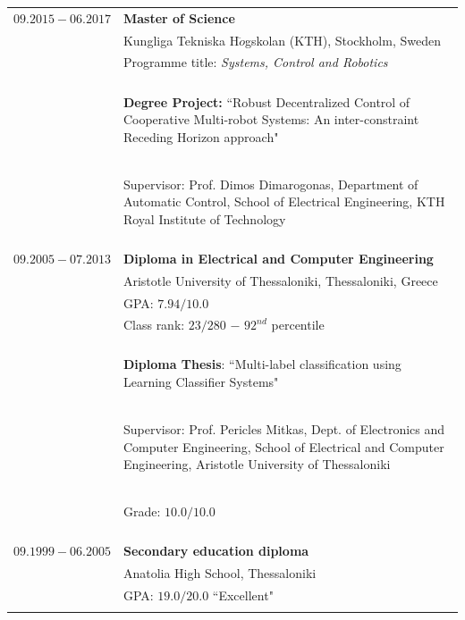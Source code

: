 \documentclass[a4paper,10pt,twoside]{article}
\begin{document}
\begin{tabular}{rp{11cm}}
$09.2015 - 06.2017$ & \textbf{Master of Science} \\
             & Kungliga Tekniska H$\ddot{o}$gskolan (KTH), Stockholm, Sweden\\
             & Programme title: \textit{Systems, Control and Robotics} \\
             & \\
             & \begin{small}\textbf{Degree Project:} ``Robust Decentralized Control of Cooperative Multi-robot Systems:
               An inter-constraint Receding Horizon approach"\end{small} \\
             & \begin{small}Supervisor: Prof. Dimos Dimarogonas, Department of Automatic Control, School of Electrical Engineering,
               KTH Royal Institute of Technology\end{small} \\
&\\
$09.2005 - 07.2013$ & \textbf{Diploma in Electrical and Computer Engineering} \\
                    & Aristotle University of Thessaloniki, Thessaloniki, Greece \\
                    & GPA: $7.94 / 10.0$ \\
                    & Class rank: $23 / 280$ $-$ $92^{nd}$ percentile \\
                    &\\
                    & \begin{small}\textbf{Diploma Thesis}: ``Multi-label classification using Learning Classifier Systems" \end{small}\\
                    & \begin{small}Supervisor: Prof. Pericles Mitkas, Dept. of Electronics and Computer Engineering, School of
                    Electrical and Computer Engineering, Aristotle University of Thessaloniki \end{small}\\
                    & \begin{small}Grade: $10.0 / 10.0$ \end{small}\\
&\\
$09.1999 - 06.2005$ & \textbf{Secondary education diploma} \\
                    & Anatolia High School, Thessaloniki \\
                    & GPA: $19.0 / 20.0$ ``Excellent"\\
                    &\\


\end{tabular}
\end{document}

